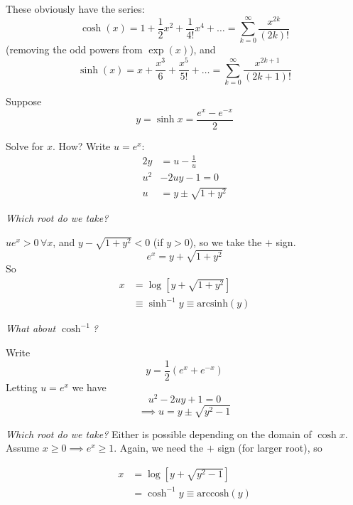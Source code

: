 \documentclass[10pt]{scrartcl}
\begin{document}
These obviously have the series:
\[\cosh(x) = 1 + \frac{1}{2}x^2 + \frac{1}{4!}x^4 + \dots = \sum_{k=0}^{\infty} \frac{x^{2k}}{(2k)!}\] 
(removing the odd powers from $\exp(x)$), and 
\[\sinh(x) = x + \frac{x^3}{6} + \frac{x^5}{5!} + \dots = \sum_{k=0}^{\infty} \frac{x^{2k+1}}{(2k+1)!}\]



  \begin{center}
\end{center}




Suppose 
\[y = \sinh x = \frac{e^{x} - e^{-x}}{2}\]

Solve for $x$. How? Write $u = e^x$:
\[
\begin{aligned}
  2y &= u - \frac{1}{u}\\
  u^2 &- 2uy - 1 = 0\\
  u &= y \pm \sqrt{1 + y^2}
\end{aligned}
\]

\emph{Which root do we take?}

$u e^x > 0\, \forall x$, and $y -\sqrt{1 + y^2} < 0$ (if $y > 0$), so we take the $+$ sign. 
\[e^x = y + \sqrt{1 + y^2}\]
So 
\[
\begin{aligned}
  x &= \log[y + \sqrt{1 + y^2}]\\
  &\equiv \sinh^{-1}y \equiv \mathrm{arcsinh}(y)
\end{aligned}
\]

\emph{What about $\cosh^{-1}$?}

Write 
\[y = \frac{1}{2}(e^x + e^{-x})\]
Letting $u = e^x$ we have 
\[u^2 - 2uy + 1= 0\]
\[\implies u = y \pm \sqrt{y^2-1}\]

\emph{Which root do we take?} Either is possible depending on the domain of $\cosh x$. Assume $x \geq 0 \implies e^x \geq 1$. Again, we need the $+$ sign (for larger root), so 

\[
\begin{aligned}
  x &= \log[y + \sqrt{y^2-1}]\\
  &= \cosh^{-1}y \equiv \mathrm{arccosh}(y)
\end{aligned}
\]
\end{document}
